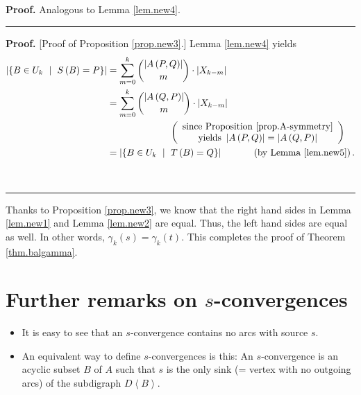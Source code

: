 \documentclass[numbers=enddot,12pt,final,onecolumn,notitlepage]{scrartcl}%
\theoremstyle{definition}
\newenvironment{proof}[1][Proof]{\noindent\textbf{#1.} }{\ \rule{0.5em}{0.5em}}
\let\sumnonlimits\sum
\renewcommand{\sum}{\sumnonlimits\limits}
\theoremstyle{plainsl}
\begin{document}
\begin{proof}
Analogous to Lemma \ref{lem.new4}.
\end{proof}

\begin{proof}
[Proof of Proposition \ref{prop.new3}.] Lemma \ref{lem.new4} yields%
\begin{align*}
\left\vert \left\{  B\in U_{k}\ \mid\ S\left(  B\right)  =P\right\}
\right\vert  & =\sum_{m=0}^{k}\dbinom{\left\vert A\left(  P,Q\right)
\right\vert }{m}\cdot\left\vert X_{k-m}\right\vert \\
& =\sum_{m=0}^{k}\dbinom{\left\vert A\left(  Q,P\right)  \right\vert }{m}%
\cdot\left\vert X_{k-m}\right\vert \\
& \ \ \ \ \ \ \ \ \ \ \ \ \ \ \ \ \ \ \ \ \left(
\begin{array}
[c]{c}%
\text{since Proposition \ref{prop.A-symmetry}}\\
\text{yields }\left\vert A\left(  P,Q\right)  \right\vert =\left\vert A\left(
Q,P\right)  \right\vert
\end{array}
\right)  \\
& =\left\vert \left\{  B\in U_{k}\ \mid\ T\left(  B\right)  =Q\right\}
\right\vert \ \ \ \ \ \ \ \ \ \ \left(  \text{by Lemma \ref{lem.new5}}\right)
.
\end{align*}

\end{proof}

Thanks to Proposition \ref{prop.new3}, we know that the right hand sides in
Lemma \ref{lem.new1} and Lemma \ref{lem.new2} are equal. Thus, the left hand
sides are equal as well. In other words, $\gamma_{k}\left(  s\right)
=\gamma_{k}\left(  t\right)  $. This completes the proof of Theorem
\ref{thm.balgamma}.

\section{Further remarks on $s$-convergences}

\begin{itemize}
\item It is easy to see that an $s$-convergence contains no arcs with source
$s$.

\item An equivalent way to define $s$-convergences is this: An $s$-convergence
is an acyclic subset $B$ of $A$ such that $s$ is the only sink (= vertex with
no outgoing arcs) of the subdigraph $D\left\langle B\right\rangle $.
\end{itemize}
\end{document}
